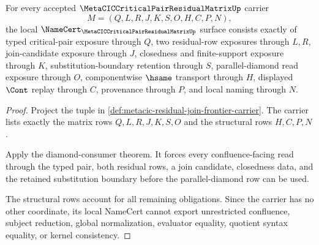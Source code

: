 \begin{theorem}
\label{thm:metacic-residual-join-frontier-namecert-obligations}
For every accepted $\MetaCICCriticalPairResidualMatrixUp$ carrier
$$
M=(Q,L,R,J,K,S,O,H,C,P,N),
$$
the local $\NameCert_{\MetaCICCriticalPairResidualMatrixUp}$ surface consists exactly of typed critical-pair exposure through $Q$, two residual-row exposures through $L,R$, join-candidate exposure through $J$, closedness and finite-support exposure through $K$, substitution-boundary retention through $S$, parallel-diamond read exposure through $O$, componentwise $\hsame$ transport through $H$, displayed $\Cont$ replay through $C$, provenance through $P$, and local naming through $N$.
\end{theorem}
\begin{proof}
Project the tuple in \autoref{def:metacic-residual-join-frontier-carrier}. The carrier lists exactly the matrix rows $Q,L,R,J,K,S,O$ and the structural rows $H,C,P,N$.

Apply the diamond-consumer theorem. It forces every confluence-facing read through the typed pair, both residual rows, a join candidate, closedness data, and the retained substitution boundary before the parallel-diamond row can be used.

The structural rows account for all remaining obligations. Since the carrier has no other coordinate, its local NameCert cannot export unrestricted confluence, subject reduction, global normalization, evaluator equality, quotient syntax equality, or kernel consistency.
\end{proof}


\begin{closurestatus}{\MetaCICCriticalPairResidualMatrixUp}
  \theoryclosure{\seedClosure}
  \formalstatus{\unformalizedV}
\end{closurestatus}
